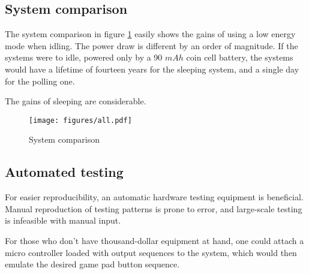 \pagebreak

\subsection{System comparison}

The system comparison in figure \ref{fig:system-comparison} easily shows the gains of using a low energy mode when idling. The power draw is different by an order of magnitude. If the systems were to idle, powered only by a 90 $mAh$ coin cell battery, the systems would have a lifetime of fourteen years for the sleeping system, and a single day for the polling one.

The gains of sleeping are considerable.

\begin{figure}[h]
\centering
\texttt{[image: figures/all.pdf]}
\caption{System comparison}
\label{fig:system-comparison}
\end{figure}

\subsection{Automated testing}

For easier reproducibility, an automatic hardware testing equipment is beneficial. Manual reproduction of testing patterns is prone to error, and large-scale testing is infeasible with manual input.

For those who don't have thousand-dollar equipment at hand, one could attach a micro controller loaded with output sequences to the system, which would then emulate the desired game pad button sequence.